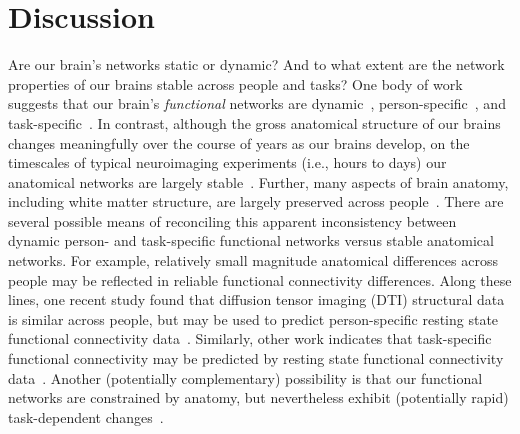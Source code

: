 \documentclass[11pt]{article}
\begin{document}
\section*{Discussion}
Are our brain's networks static or dynamic?  And to what extent are
the network properties of our brains stable across people and tasks?
One body of work suggests that our brain's \textit{functional}
networks are dynamic~\citep[e.g., ][]{MannEtal18},
person-specific~\citep[e.g., ][]{FinnEtal15}, and
task-specific~\citep[e.g., ][]{Turk13}.  In contrast, although the
gross anatomical structure of our brains changes meaningfully over the
course of years as our brains develop, on the timescales of typical
neuroimaging experiments (i.e., hours to days) our anatomical networks
are largely stable~\citep[e.g., ][]{CaseEtal00}.  Further, many
aspects of brain anatomy, including white matter structure, are largely
preserved across people~\citep[e.g., ][]{TalaTour88, JahaEtal13,
  MoriEtal08}. There are several possible means of reconciling this
apparent inconsistency between dynamic person- and task-specific
functional networks versus stable anatomical networks.  For example,
relatively small magnitude anatomical differences across people may be
reflected in reliable functional connectivity differences.  Along
these lines, one recent study found that diffusion tensor imaging
(DTI) structural data is similar across people, but may be used to
predict person-specific resting state functional connectivity
data~\citep{BeckEtal18}.  Similarly, other work indicates that
task-specific functional connectivity may be predicted by resting
state functional connectivity data~\citep{ColeEtal16, TavoEtal16}.  Another
(potentially complementary) possibility is that our functional
networks are constrained by anatomy, but nevertheless exhibit
(potentially rapid) task-dependent changes~\citep[e.g.,
][]{SporBetz16}.
\end{document}
